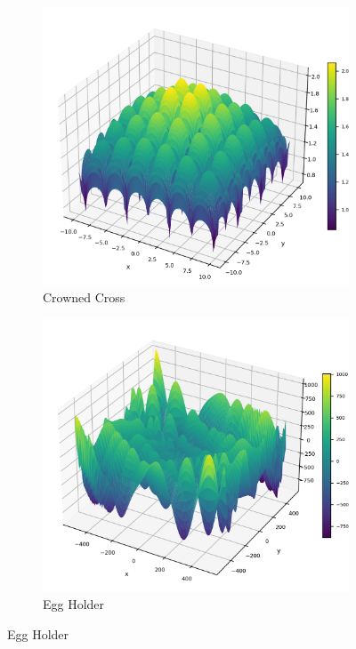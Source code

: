 \begin{figure}[!hb]
\begin{subfigure}{0.32\textwidth}
        \includegraphics[width=1\textwidth]{Figures/benchmark_plots/Crowned_Cross_maximized.png}
        \caption{Crowned Cross}
    \end{subfigure}
    \begin{subfigure}{0.32\textwidth}
        \centering
        \includegraphics[width=1\textwidth]{Figures/benchmark_plots/Egg_Holder_maximized.png}
        \caption{Egg Holder}

\end{subfigure}
\end{figure}
